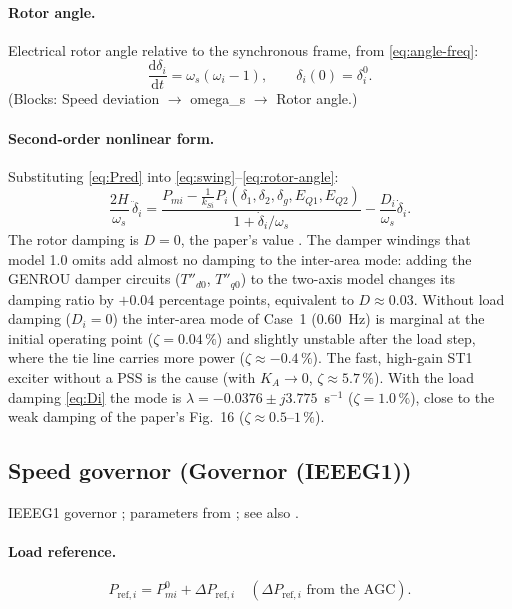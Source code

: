 \documentclass[11pt,a4paper]{article}
\numberwithin{equation}{section}
\newcommand{\dd}{\mathrm{d}}
\newcommand{\blk}[1]{\textsf{#1}}
\begin{document}
\paragraph{Rotor angle.} Electrical rotor angle relative to the synchronous frame, from \eqref{eq:angle-freq}:
\begin{equation}
\boxed{\frac{\dd\delta_i}{\dd t} = \omega_s(\omega_i - 1),\qquad \delta_i(0) = \delta_i^0.}
\label{eq:rotor-angle}
\end{equation}
(Blocks: \blk{Speed deviation} $\to$ \blk{omega\_s} $\to$ \blk{Rotor angle}.)

\paragraph{Second-order nonlinear form.} Substituting \eqref{eq:Pred} into \eqref{eq:swing}--\eqref{eq:rotor-angle}:
\begin{equation}
\frac{2H}{\omega_s}\,\ddot\delta_i
= \frac{P_{mi} - \tfrac{1}{k_{Si}}P_i(\delta_1,\delta_2,\delta_g,E_{Q1},E_{Q2})}{1+\dot\delta_i/\omega_s}
- \frac{D_i}{\omega_s}\dot\delta_i .
\end{equation}
The rotor damping is $D=0$, the paper's value \cite[Table~5]{RA2021access}. The damper windings that model 1.0 omits add almost no damping to the inter-area mode: adding the GENROU damper circuits ($T''_{d0}$, $T''_{q0}$) to the two-axis model changes its damping ratio by $+0.04$ percentage points, equivalent to $D\approx0.03$. Without load damping ($D_i = 0$) the inter-area mode of Case~1 (0.60~Hz) is marginal at the initial operating point ($\zeta = 0.04\,\%$) and slightly unstable after the load step, where the tie line carries more power ($\zeta \approx -0.4\,\%$). The fast, high-gain ST1 exciter without a PSS is the cause (with $K_A\to 0$, $\zeta \approx 5.7\,\%$). With the load damping \eqref{eq:Di} the mode is $\lambda = -0.0376 \pm j3.775$~s$^{-1}$ ($\zeta = 1.0\,\%$), close to the weak damping of the paper's Fig.~16 ($\zeta \approx 0.5$--$1\,\%$).

\subsection{Speed governor (\blk{Governor (IEEEG1)})}
IEEEG1 governor \cite{IEEE1973,PESTR1}; parameters from \cite[Table~7]{RA2021access}; see also \cite[Ch.~9]{Kundur1994}.
\paragraph{Load reference.}
\begin{equation}
P_{\text{ref},i} = P_{mi}^0 + \Delta P_{\text{ref},i}\quad(\Delta P_{\text{ref},i}\text{ from the AGC}).
\end{equation}
\end{document}

